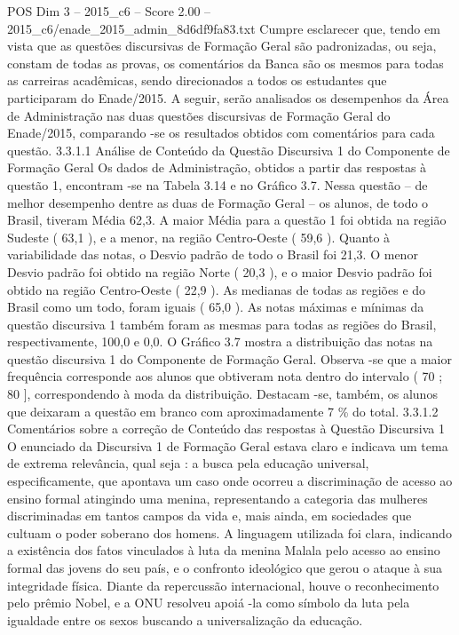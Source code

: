 \begin{textsample}{POS Dim 3 – 2015\_c6 – Score 2.00 – 2015\_c6/enade\_2015\_admin\_8d6df9fa83.txt}
Cumpre esclarecer que, tendo em vista que as questões discursivas de Formação Geral são padronizadas, ou seja, constam de todas as provas, os comentários da Banca são os mesmos para todas as carreiras acadêmicas, sendo direcionados a todos os estudantes que participaram do Enade/2015.
A seguir, serão analisados os desempenhos da Área de Administração nas duas questões discursivas de Formação Geral do Enade/2015, comparando -se os resultados obtidos com comentários para cada questão. 3.3.1.1 Análise de Conteúdo da Questão Discursiva 1 do Componente de Formação Geral Os dados de Administração, obtidos a partir das respostas à questão 1, encontram -se na Tabela 3.14 e no Gráfico 3.7.
Nessa questão – de melhor desempenho dentre as duas de Formação Geral – os alunos, de todo o Brasil, tiveram Média 62,3.
A maior Média para a questão 1 foi obtida na região Sudeste ( 63,1 ), e a menor, na região Centro-Oeste ( 59,6 ).
Quanto à variabilidade das notas, o Desvio padrão de todo o Brasil foi 21,3.
O menor Desvio padrão foi obtido na região Norte ( 20,3 ), e o maior Desvio padrão foi obtido na região Centro-Oeste ( 22,9 ).
As medianas de todas as regiões e do Brasil como um todo, foram iguais ( 65,0 ).
As notas máximas e mínimas da questão discursiva 1 também foram as mesmas para todas as regiões do Brasil, respectivamente, 100,0 e 0,0.
O Gráfico 3.7 mostra a distribuição das notas na questão discursiva 1 do Componente de Formação Geral.
Observa -se que a maior frequência corresponde aos alunos que obtiveram nota dentro do intervalo ( 70 ; 80 ], correspondendo à moda da distribuição.
Destacam -se, também, os alunos que deixaram a questão em branco com aproximadamente 7 \% do total. 3.3.1.2 Comentários sobre a correção de Conteúdo das respostas à Questão Discursiva 1 O enunciado da Discursiva 1 de Formação Geral estava claro e indicava um tema de extrema relevância, qual seja : a busca pela educação universal, especificamente, que apontava um caso onde ocorreu a discriminação de acesso ao ensino formal atingindo uma menina, representando a categoria das mulheres discriminadas em tantos campos da vida e, mais ainda, em sociedades que cultuam o poder soberano dos homens.
A linguagem utilizada foi clara, indicando a existência dos fatos vinculados à luta da menina Malala pelo acesso ao ensino formal das jovens do seu país, e o confronto ideológico que gerou o ataque à sua integridade física.
Diante da repercussão internacional, houve o reconhecimento pelo prêmio Nobel, e a ONU resolveu apoiá -la como símbolo da luta pela igualdade entre os sexos buscando a universalização da educação.

\end{textsample}
